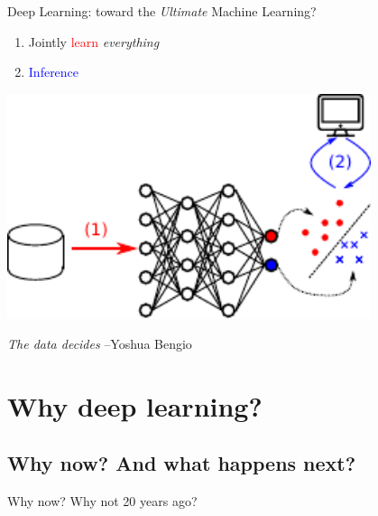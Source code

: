 \documentclass{beamer}
\newcommand{\tred}[1]{\textcolor{red}{#1}}
\newcommand{\tblue}[1]{\textcolor{blue}{#1}}
\begin{document}
\begin{frame}{Deep Learning: toward the \emph{Ultimate} Machine Learning?}
    \raggedright
    \begin{enumerate}
        \item Jointly \tred{learn} \emph{everything}
        \item \tblue{Inference}
    \end{enumerate}

    \vspace{-24mm}
    \begin{center}
    \includegraphics[width=0.8\textwidth]{pipeline3.pdf}
    \end{center}

    \raggedleft
    \emph{The data decides}
    {\small --Yoshua Bengio}

\end{frame}

\section{Why deep learning?}


\subsection{Why now? And what happens next?}

\begin{frame}
    \centering
Why now? Why not 20 years ago?

\end{frame}
\end{document}
